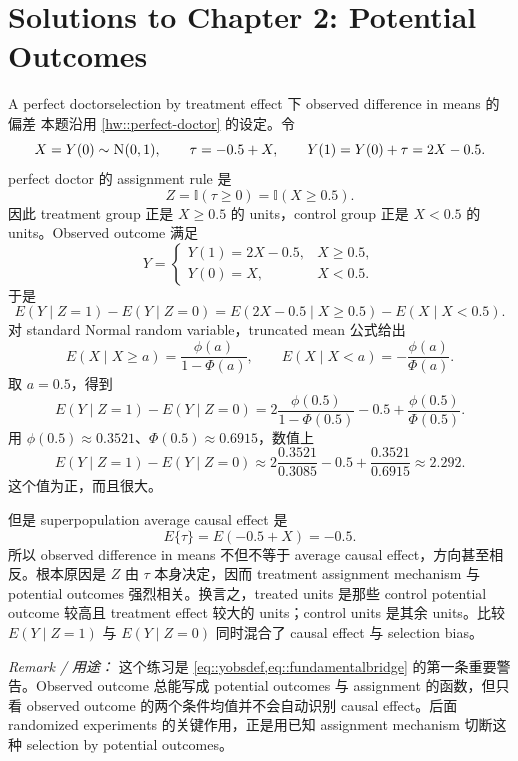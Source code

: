 \chapter{Solutions to Chapter 2: Potential Outcomes}
\label{sol:chapter02}

\begin{exercisesolution}{A perfect doctor}{selection by treatment effect 下 observed difference in means 的偏差}
本题沿用 \cref{hw::perfect-doctor} 的设定。令
\[
X=Y(0)\sim \textsc{N}(0,1),\qquad \tau=-0.5+X,\qquad Y(1)=Y(0)+\tau=2X-0.5.
\]
perfect doctor 的 assignment rule 是
\[
Z=\mathbb{I}(\tau\geq 0)=\mathbb{I}(X\geq 0.5).
\]
因此 treatment group 正是 $X\geq 0.5$ 的 units，control group 正是 $X<0.5$ 的 units。Observed outcome 满足
\[
Y=
\begin{cases}
Y(1)=2X-0.5,& X\geq 0.5,\\
Y(0)=X,& X<0.5.
\end{cases}
\]
于是
\[
E(Y\mid Z=1)-E(Y\mid Z=0)
=
E(2X-0.5\mid X\geq 0.5)-E(X\mid X<0.5).
\]
对 standard Normal random variable，truncated mean 公式给出
\[
E(X\mid X\geq a)=\frac{\phi(a)}{1-\Phi(a)},\qquad
E(X\mid X<a)=-\frac{\phi(a)}{\Phi(a)}.
\]
取 $a=0.5$，得到
\[
E(Y\mid Z=1)-E(Y\mid Z=0)
=2\frac{\phi(0.5)}{1-\Phi(0.5)}-0.5+\frac{\phi(0.5)}{\Phi(0.5)}.
\]
用 $\phi(0.5)\approx 0.3521$、$\Phi(0.5)\approx 0.6915$，数值上
\[
E(Y\mid Z=1)-E(Y\mid Z=0)
\approx 2\frac{0.3521}{0.3085}-0.5+\frac{0.3521}{0.6915}
\approx 2.292 .
\]
这个值为正，而且很大。

但是 superpopulation average causal effect 是
\[
E\{\tau\}=E(-0.5+X)=-0.5.
\]
所以 observed difference in means 不但不等于 average causal effect，方向甚至相反。根本原因是 $Z$ 由 $\tau$ 本身决定，因而 treatment assignment mechanism 与 potential outcomes 强烈相关。换言之，treated units 是那些 control potential outcome 较高且 treatment effect 较大的 units；control units 是其余 units。比较 $E(Y\mid Z=1)$ 与 $E(Y\mid Z=0)$ 同时混合了 causal effect 与 selection bias。

\emph{Remark / 用途：} 这个练习是 \cref{eq::yobsdef,eq::fundamentalbridge} 的第一条重要警告。Observed outcome 总能写成 potential outcomes 与 assignment 的函数，但只看 observed outcome 的两个条件均值并不会自动识别 causal effect。后面 randomized experiments 的关键作用，正是用已知 assignment mechanism 切断这种 selection by potential outcomes。
\end{exercisesolution}

